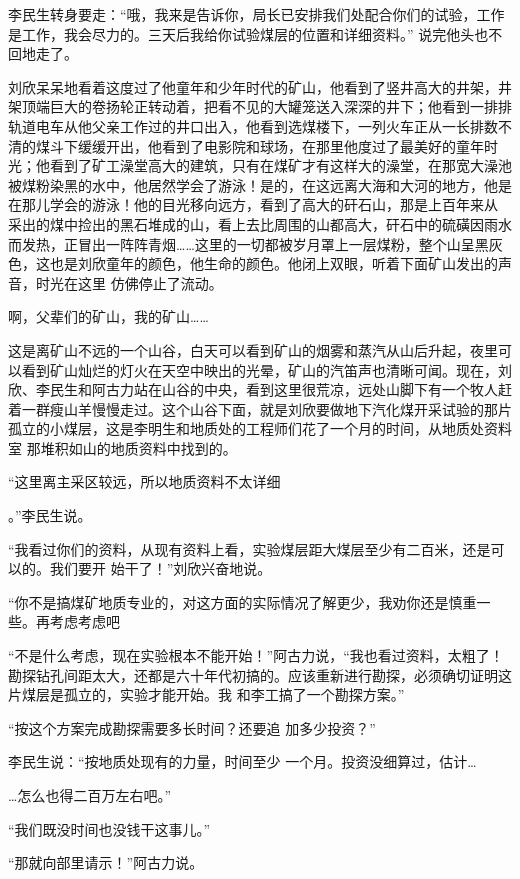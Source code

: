 \documentclass{article}
\begin{document}
李民生转身要走：“哦，我来是告诉你，局长已安排我们处配合你们的试验，工作是工作，我会尽力的。三天后我给你试验煤层的位置和详细资料。”
说完他头也不回地走了。 

刘欣呆呆地看着这度过了他童年和少年时代的矿山，他看到了竖井高大的井架，井架顶端巨大的卷扬轮正转动着，把看不见的大罐笼送入深深的井下；他看到一排排轨道电车从他父亲工作过的井口出入，他看到选煤楼下，一列火车正从一长排数不清的煤斗下缓缓开出，他看到了电影院和球场，在那里他度过了最美好的童年时光；他看到了矿工澡堂高大的建筑，只有在煤矿才有这样大的澡堂，在那宽大澡池被煤粉染黑的水中，他居然学会了游泳！是的，在这远离大海和大河的地方，他是在那儿学会的游泳！他的目光移向远方，看到了高大的矸石山，那是上百年来从
\newpage
采出的煤中捡出的黑石堆成的山，看上去比周围的山都高大，矸石中的硫磺因雨水而发热，正冒出一阵阵青烟……这里的一切都被岁月罩上一层煤粉，整个山呈黑灰色，这也是刘欣童年的颜色，他生命的颜色。他闭上双眼，听着下面矿山发出的声音，时光在这里
仿佛停止了流动。 


啊，父辈们的矿山，我的矿山…… 


这是离矿山不远的一个山谷，白天可以看到矿山的烟雾和蒸汽从山后升起，夜里可以看到矿山灿烂的灯火在天空中映出的光晕，矿山的汽笛声也清晰可闻。现在，刘欣、李民生和阿古力站在山谷的中央，看到这里很荒凉，远处山脚下有一个牧人赶着一群瘦山羊慢慢走过。这个山谷下面，就是刘欣要做地下汽化煤开采试验的那片孤立的小煤层，这是李明生和地质处的工程师们花了一个月的时间，从地质处资料室
那堆积如山的地质资料中找到的。 

“这里离主采区较远，所以地质资料不太详细
\newpage

。”李民生说。 

“我看过你们的资料，从现有资料上看，实验煤层距大煤层至少有二百米，还是可以的。我们要开
始干了！”刘欣兴奋地说。 

“你不是搞煤矿地质专业的，对这方面的实际情况了解更少，我劝你还是慎重一些。再考虑考虑吧

“不是什么考虑，现在实验根本不能开始！”阿古力说，“我也看过资料，太粗了！勘探钻孔间距太大，还都是六十年代初搞的。应该重新进行勘探，必须确切证明这片煤层是孤立的，实验才能开始。我
和李工搞了一个勘探方案。” 

“按这个方案完成勘探需要多长时间？还要追
加多少投资？” 

李民生说：“按地质处现有的力量，时间至少
一个月。投资没细算过，估计… 

\newpage


…怎么也得二百万左右吧。” 


“我们既没时间也没钱干这事儿。” 


“那就向部里请示！”阿古力说。 
\end{document}
